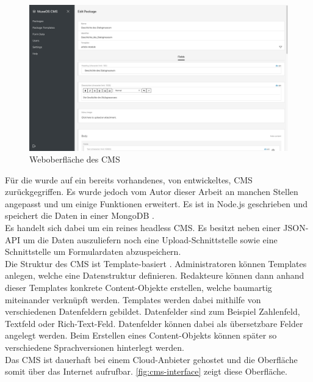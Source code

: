\begin{figure}
    \centering
    \includegraphics[width=1\textwidth]{figures/images/cms-interface.png}
    \caption{Weboberfläche des CMS}
    \label{fig:cms-interface}
\end{figure}

Für die \shst{} wurde auf ein bereits vorhandenes, von \meso{} entwickeltes,
CMS zurückgegriffen. Es wurde jedoch vom Autor dieser Arbeit
an manchen Stellen angepasst und um einige Funktionen
erweitert. Es ist in Node.js \cite{node} geschrieben und speichert die Daten in einer 
MongoDB \cite{mongo}.\\
Es handelt sich dabei um ein reines headless CMS. Es besitzt neben einer JSON-API um die Daten 
auszuliefern noch eine Upload-Schnittstelle sowie eine Schnittstelle um Formulardaten abzuspeichern.\\
Die Struktur des CMS ist Template-basiert . Administratoren können Templates 
anlegen, welche eine Datenstruktur definieren. Redakteure können dann anhand dieser Templates 
konkrete Content-Objekte erstellen, welche baumartig miteinander verknüpft werden. Templates 
werden dabei mithilfe von verschiedenen Datenfeldern gebildet. Datenfelder sind zum Beispiel
Zahlenfeld, Textfeld oder Rich-Text-Feld. Datenfelder können dabei als übersetzbare Felder angelegt
werden. Beim Erstellen eines Content-Objekts können später so verschiedene Sprachversionen
hinterlegt werden.\\
Das CMS ist dauerhaft bei einem Cloud-Anbieter gehostet und die Oberfläche somit über das
Internet aufrufbar. \autoref{fig:cms-interface} zeigt diese Oberfläche.
